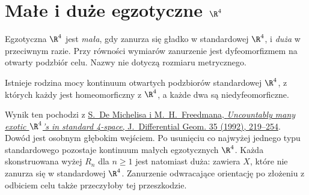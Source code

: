 \section{Małe i duże egzotyczne \texorpdfstring{$\R^4$}{R4}}
\label{sec:egzotyczne-r4-male-duze}

Egzotyczna $\R^4$ jest \emph{mała}, gdy zanurza
się gładko w standardowej $\R^4$, i \emph{duża}
w przeciwnym razie. Przy równości wymiarów
zanurzenie jest dyfeomorfizmem na otwarty
podzbiór celu. Nazwy nie dotyczą rozmiaru
metrycznego.

\begin{twierdzenie}
\label{thm:egzotyczne-r4-male}
Istnieje rodzina mocy kontinuum otwartych
podzbiorów standardowej $\R^4$, z których
każdy jest homeomorficzny z $\R^4$, a każde
dwa są niedyfeomorficzne.
\end{twierdzenie}

Wynik ten pochodzi z
\href{https://doi.org/10.4310/jdg/1214447810}
{S.~De Michelisa i M.~H.~Freedmana,
\emph{Uncountably many exotic $\R^4$'s in
standard 4-space}, J.~Differential Geom. 35
(1992), 219--254}. Dowód jest osobnym głębokim
wejściem. Po usunięciu co najwyżej jednego typu
standardowego pozostaje kontinuum małych
egzotycznych $\R^4$. Każda skonstruowana wyżej
$R_n$ dla $n\geq1$ jest natomiast duża: zawiera
$X$, które nie zanurza się w standardowej $\R^4$.
Zanurzenie odwracające orientację po złożeniu
z odbiciem celu także przeczyłoby tej przeszkodzie.
